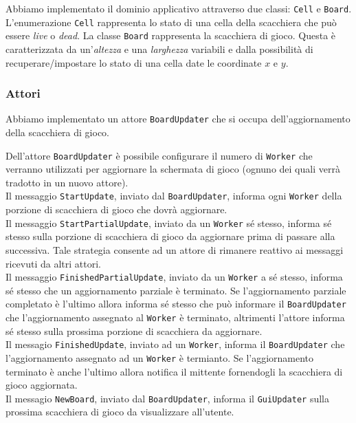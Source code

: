 \documentclass[a4paper]{article}
\begin{document}
Abbiamo implementato il dominio applicativo attraverso due classi: \texttt{Cell} e \texttt{Board}.\\
L'enumerazione \texttt{Cell} rappresenta lo stato di una cella della scacchiera che può essere \textit{live} o \textit{dead}.
La classe \texttt{Board} rappresenta la scacchiera di gioco. Questa è caratterizzata da un'\textit{altezza} e una \textit{larghezza} variabili e dalla possibilità di recuperare/impostare lo stato di una cella date le coordinate $x$ e $y$.

\subsubsection{Attori}\label{attori}

Abbiamo implementato un attore \texttt{BoardUpdater} che si occupa dell'aggiornamento della scacchiera di gioco.

Dell'attore \texttt{BoardUpdater} è possibile configurare il numero di \texttt{Worker} che verranno utilizzati per aggiornare la schermata di gioco (ognuno dei quali verrà tradotto in un nuovo attore).\\
Il messaggio \texttt{StartUpdate}, inviato dal \texttt{BoardUpdater}, informa ogni \texttt{Worker} della porzione di scacchiera di gioco che dovrà aggiornare.\\
Il messaggio \texttt{StartPartialUpdate}, inviato da un \texttt{Worker} sé stesso, informa sé stesso sulla porzione di scacchiera di gioco da aggiornare prima di passare alla successiva. Tale strategia consente ad un attore di rimanere reattivo ai messaggi ricevuti da altri attori.\\
Il messaggio \texttt{FinishedPartialUpdate}, inviato da un \texttt{Worker} a sé stesso, informa sé stesso che un aggiornamento parziale è terminato. Se l'aggiornamento parziale completato è l'ultimo allora informa sé stesso che può informare il \texttt{BoardUpdater} che l'aggiornamento assegnato al \texttt{Worker} è terminato, altrimenti l'attore informa sé stesso sulla prossima porzione di scacchiera da aggiornare.\\
Il messagio \texttt{FinishedUpdate}, inviato ad un \texttt{Worker}, informa il \texttt{BoardUpdater} che l'aggiornamento assegnato ad un \texttt{Worker} è termianto. Se l'aggiornamento terminato è anche l'ultimo allora notifica il mittente fornendogli la scacchiera di gioco aggiornata.\\
Il messagio \texttt{NewBoard}, inviato dal \texttt{BoardUpdater}, informa il \texttt{GuiUpdater} sulla prossima scacchiera di gioco da visualizzare all'utente.
\end{document}
